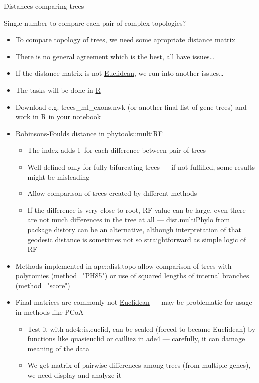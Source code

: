 \documentclass[compress, ucs, xelatex, 11pt, xcolor=x11names, aspectratio=169,
	hyperref={
		bookmarks=true,
		unicode=true,
		colorlinks=true,
		pdftitle={HybSeq course},
		plainpages=false,
		pdfauthor={Vojtech Zeisek},
		pdfsubject={Practical processing of HybSeq target enrichment sequencing data on computing grids like MetaCentrum},
		pdfcreator={XeLaTeX},
		pdfkeywords={BASH, command line, GNU, HybSeq, Linux, MetaCentrum, sequencing shell, target enrichment},
		linkcolor=Turquoise4, %
		anchorcolor=DodgerBlue4, %
		citecolor=DodgerBlue4, %
		filecolor=DodgerBlue4, %
		menucolor=Tan4, %
		urlcolor=DarkOliveGreen4, %
		pdftex},
	url={hyphens, lowtilde} %
	]{beamer}
\renewcommand{\texttt}[1]{\colorbox{Cornsilk2}{{\ttfamily #1}}}
\begin{document}
\begin{frame}[allowframebreaks]{Distances comparing trees}
	\begin{alertblock}{Single number to compare each pair of complex topologies?}
		\begin{itemize}
			\item To compare topology of trees, we need some apropriate distance matrix
			\item There is no general agreement which is the best, all have issues\ldots
			\item If the distance matrix is not \href{https://en.wikipedia.org/wiki/Euclidean_distance_matrix}{Euclidean}, we run into another issues\ldots
		\end{itemize}
	\end{alertblock}
	\begin{itemize}
		\item The tasks will be done in \href{https://www.r-project.org/}{R}
		\item Download e.g. \texttt{trees\_ml\_exons.nwk} (or another final list of gene trees) and work in \texttt{R} in your notebook
		\item Robinsons-Foulds distance in \texttt{phytools::multiRF}
		\begin{itemize}
			\item The index adds 1~for each difference between pair of trees
			\item Well defined only for fully bifurcating trees --- if not fulfilled, some results might be misleading
			\item Allow comparison of trees created by different methods
			\item If the difference is very close to root, RF value can be large, even there are not much differences in the tree at all --- \texttt{dist.multiPhylo} from package \href{https://CRAN.R-project.org/package=distory}{distory} can be an alternative, although interpretation of that geodesic distance is sometimes not so straightforward as simple logic of RF
		\end{itemize}
		\item Methods implemented in \texttt{ape::dist.topo} allow comparison of trees with polytomies (\texttt{method="PH85"}) or use of squared lengths of internal branches (\texttt{method="score"})
		\item Final matrices are commonly not \href{https://en.wikipedia.org/wiki/Euclidean_distance_matrix}{Euclidean} --- may be problematic for usage in methods like PCoA
		\begin{itemize}
			\item Test it with \texttt{ade4::is.euclid}, can be scaled (forced to became Euclidean) by functions like \texttt{quasieuclid} or \texttt{cailliez} in \texttt{ade4} --- carefully, it can damage meaning of the data
			\item We get matrix of pairwise differences among trees (from multiple genes), we need display and analyze it
		\end{itemize}
	\end{itemize}
\end{frame}
\end{document}

